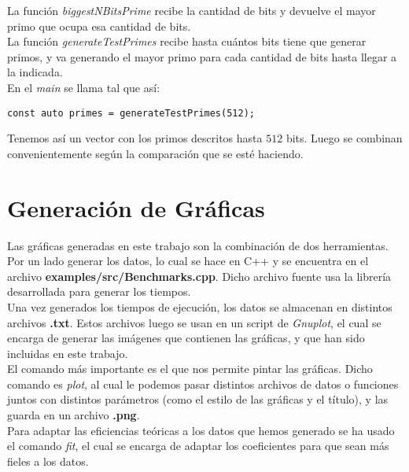 La función \textit{biggestNBitsPrime} recibe la cantidad de bits y devuelve el mayor primo que ocupa esa cantidad de bits.\\

La función \textit{generateTestPrimes} recibe hasta cuántos bits tiene que generar primos, y va generando el mayor primo para cada cantidad de bits hasta llegar a la indicada.\\

En el \textit{main} se llama tal que así:

\begin{lstlisting}
const auto primes = generateTestPrimes(512);
\end{lstlisting}

Tenemos así un vector con los primos descritos hasta $512$ bits. Luego se combinan convenientemente según la comparación que se esté haciendo.

\section{Generación de Gráficas}

Las gráficas generadas en este trabajo son la combinación de dos herramientas.\\

Por un lado generar los datos, lo cual se hace en C++ y se encuentra en el archivo \textbf{examples/src/Benchmarks.cpp}. Dicho archivo fuente usa la librería desarrollada para generar los tiempos.\\

Una vez generados los tiempos de ejecución, los datos se almacenan en distintos archivos \textbf{.txt}. Estos archivos luego se usan en un script de \textit{Gnuplot}, el cual se encarga de generar las imágenes que contienen las gráficas, y que han sido incluidas en este trabajo.\\

El comando más importante es el que nos permite pintar las gráficas. Dicho comando es \textit{plot}, al cual le podemos pasar distintos archivos de datos o funciones juntos con distintos parámetros (como el estilo de las gráficas y el título), y las guarda en un archivo \textbf{.png}.\\

Para adaptar las eficiencias teóricas a los datos que hemos generado se ha usado el comando \textit{fit}, el cual se encarga de adaptar los coeficientes para que sean más fieles a los datos.

\endinput
